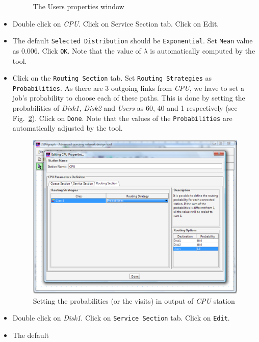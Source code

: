 \begin{itemize}
\begin{figure}[htb]
\begin{center}
    \end{center}
    \caption{The Users properties window}
    \label{fig:uspropwin}
\end{figure}
\item Double click on \emph{CPU}. Click on Service Section tab.
Click on Edit. \item The default \texttt{Selected Distribution}
should be \texttt{Exponential}. Set \texttt{Mean} value as 0.006.
Click \texttt{OK}. Note that the value of $\lambda$ is
automatically computed by the tool.

\item Click on the \texttt{Routing Section} tab. Set
\texttt{Routing Strategies} as \texttt{Probabilities}. As there
are 3 outgoing links from \emph{CPU}, we have to set a job's
probability to choose each of these paths. This is done by setting
the probabilities of \emph{Disk1, Disk2} and \emph{Users} as 60,
40 and 1 respectively (see Fig.~\ref{fig:probcpu}). Click on
\texttt{Done}. Note that the values of the \texttt{Probabilities}
are automatically adjusted by the tool.
\begin{figure}[htb]
    \begin{center}
        \includegraphics[scale=.5]{img/jsimg/12.6.eps}
    \end{center}
    \caption{Setting the probabilities (or the visits) in output
    of  \emph{CPU} station}
    \label{fig:probcpu}
\end{figure}
\item Double click on \emph{Disk1}. Click on \texttt{Service
Section} tab. Click on \texttt{Edit}. \item The default

\end{itemize}
